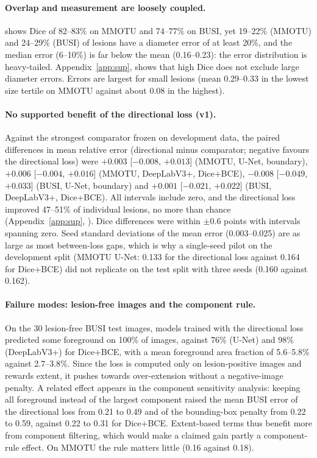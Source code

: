 \documentclass{midl}
\begin{document}
\paragraph{Overlap and measurement are loosely coupled.}
 shows Dice of 82--83\% on MMOTU and 74--77\% on BUSI, yet 19--22\% (MMOTU) and 24--29\% (BUSI) of lesions have a diameter error of at least 20\%, and the median error (6--10\%) is far below the mean (0.16--0.23): the error distribution is heavy-tailed. Appendix~\ref{app:sup},  shows that high Dice does not exclude large diameter errors. Errors are largest for small lesions (mean 0.29--0.33 in the lowest size tertile on MMOTU against about 0.08 in the highest).

\paragraph{No supported benefit of the directional loss (v1).}
Against the strongest comparator frozen on development data, the paired differences in mean relative error (directional minus comparator; negative favours the directional loss) were $+0.003$ [$-0.008$, $+0.013$] (MMOTU, U-Net, boundary), $+0.006$ [$-0.004$, $+0.016$] (MMOTU, DeepLabV3+, Dice+BCE), $-0.008$ [$-0.049$, $+0.033$] (BUSI, U-Net, boundary) and $+0.001$ [$-0.021$, $+0.022$] (BUSI, DeepLabV3+, Dice+BCE). All intervals include zero, and the directional loss improved 47--51\% of individual lesions, no more than chance (Appendix~\ref{app:sup}, ). Dice differences were within $\pm0.6$ points with intervals spanning zero. Seed standard deviations of the mean error (0.003--0.025) are as large as most between-loss gaps, which is why a single-seed pilot on the development split (MMOTU U-Net: 0.133 for the directional loss against 0.164 for Dice+BCE) did not replicate on the test split with three seeds (0.160 against 0.162).

\paragraph{Failure modes: lesion-free images and the component rule.}
On the 30 lesion-free BUSI test images, models trained with the directional loss predicted some foreground on 100\% of images, against 76\% (U-Net) and 98\% (DeepLabV3+) for Dice+BCE, with a mean foreground area fraction of 5.6--5.8\% against 2.7--3.8\%. Since the loss is computed only on lesion-positive images and rewards extent, it pushes towards over-extension without a negative-image penalty. A related effect appears in the component sensitivity analysis: keeping all foreground instead of the largest component raised the mean BUSI error of the directional loss from 0.21 to 0.49 and of the bounding-box penalty from 0.22 to 0.59, against 0.22 to 0.31 for Dice+BCE. Extent-based terms thus benefit more from component filtering, which would make a claimed gain partly a component-rule effect. On MMOTU the rule matters little (0.16 against 0.18).
\end{document}
